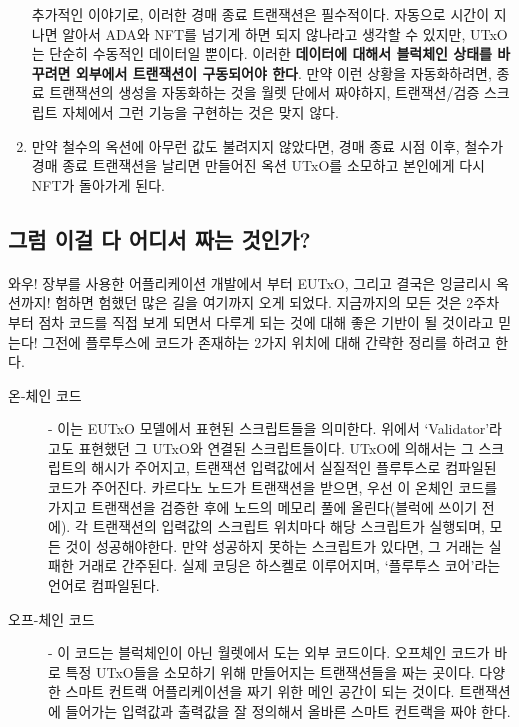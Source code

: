 \documentclass[a4paper, 11pt]{article}
\begin{document}
\begin{enumerate}
        추가적인 이야기로, 이러한 경매 종료 트랜잭션은 필수적이다. 자동으로 시간이 지나면 알아서 ADA와 NFT를 넘기게 하면 되지 않나라고 생각할 수 있지만, UTxO는 단순히 수동적인 데이터일 뿐이다. 이러한 \textbf{데이터에 대해서 블럭체인 상태를 바꾸려면 외부에서 트랜잭션이 구동되어야 한다}. 만약 이런 상황을 자동화하려면, 종료 트랜잭션의 생성을 자동화하는 것을 월렛 단에서 짜야하지, 트랜잭션/검증 스크립트 자체에서 그런 기능을 구현하는 것은 맞지 않다.
        \item 만약 철수의 옥션에 아무런 값도 불려지지 않았다면, 경매 종료 시점 이후, 철수가 경매 종료 트랜잭션을 날리면 만들어진 옥션 UTxO를 소모하고 본인에게 다시 NFT가 돌아가게 된다.

    \end{enumerate}

    \subsection{그럼 이걸 다 어디서 짜는 것인가?}

    \paragraph{} 와우! 장부를 사용한 어플리케이션 개발에서 부터 EUTxO, 그리고 결국은 잉글리시 옥션까지! 험하면 험했던 많은 길을 여기까지 오게 되었다. 지금까지의 모든 것은 2주차 부터 점차 코드를 직접 보게 되면서 다루게 되는 것에 대해 좋은 기반이 될 것이라고 믿는다! 그전에 플루투스에 코드가 존재하는 2가지 위치에 대해 간략한 정리를 하려고 한다.

    \begin{description}
        \item[온-체인 코드] - 이는 EUTxO 모델에서 표현된 스크립트들을 의미한다. 위에서 `Validator'라고도 표현했던 그 UTxO와 연결된 스크립트들이다. UTxO에 의해서는 그 스크립트의 해시가 주어지고, 트랜잭션 입력값에서 실질적인 플루투스로 컴파일된 코드가 주어진다. 카르다노 노드가 트랜잭션을 받으면, 우선 이 온체인 코드를 가지고 트랜잭션을 검증한 후에 노드의 메모리 풀에 올린다(블럭에 쓰이기 전에). 각 트랜잭션의 입력값의 스크립트 위치마다 해당 스크립트가 실행되며, 모든 것이 성공해야한다. 만약 성공하지 못하는 스크립트가 있다면, 그 거래는 실패한 거래로 간주된다. 실제 코딩은 하스켈로 이루어지며, `플루투스 코어'라는 언어로 컴파일된다. 
        \item[오프-체인 코드] - 이 코드는 블럭체인이 아닌 월렛에서 도는 외부 코드이다. 오프체인 코드가 바로 특정 UTxO들을 소모하기 위해 만들어지는 트랜잭션들을 짜는 곳이다. 다양한 스마트 컨트랙 어플리케이션을 짜기 위한 메인 공간이 되는 것이다. 트랜잭션에 들어가는 입력값과 출력값을 잘 정의해서 올바른 스마트 컨트랙을 짜야 한다.   
    \end{description}
\end{document}
